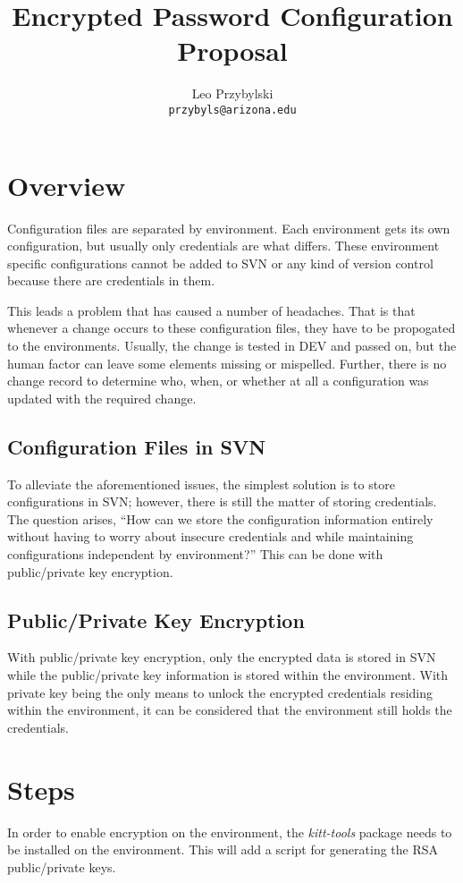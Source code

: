 \documentclass[12pt,notitlepage]{article}
\author{Leo Przybylski \\
\texttt{przybyls@arizona.edu}}
\title{Encrypted Password Configuration Proposal}
\begin{document}
\maketitle

\lstset{basicstyle=\small,
  breaklines=true,
  includerangemarker=false}

\section{Overview}
Configuration files are separated by environment. Each environment gets its own configuration, but
usually only credentials are what differs. These environment specific configurations cannot be added
to SVN or any kind of version control because there are credentials in them.

This leads a problem that has caused a number of headaches. That is that whenever a change occurs to
these configuration files, they have to be propogated to the environments. Usually, the change is tested
in DEV and passed on, but the human factor can leave some elements missing or mispelled. Further, there
is no change record to determine who, when, or whether at all a configuration was updated with the 
required change.

\subsection{Configuration Files in SVN}
To alleviate the aforementioned issues, the simplest solution is to store configurations in SVN; however, 
there is still the matter of storing credentials. The question arises, ``How can we store the configuration
information entirely without having to worry about insecure credentials and while maintaining configurations
independent by environment?'' This can be done with public/private key encryption.

\subsection{Public/Private Key Encryption}
With public/private key encryption, only the encrypted data is stored in SVN while the public/private key information
is stored within the environment. With private key being the only means to unlock the encrypted credentials
residing within the environment, it can be considered that the environment still holds the credentials.

\section{Steps}
In order to enable encryption on the environment, the \emph{kitt-tools} package needs to be installed on the
environment. This will add a script for generating the RSA public/private keys.
\end{document}
